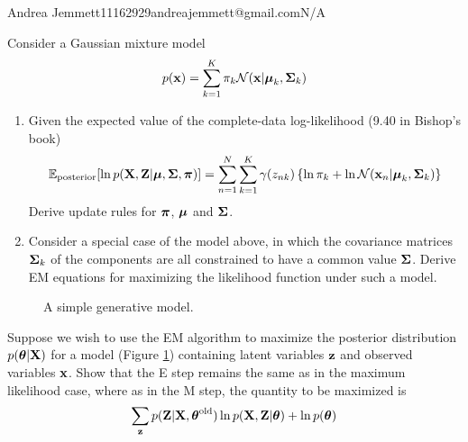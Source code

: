 \documentclass{amsmlaj}
\begin{document}
{Andrea Jemmett}{11162929}{andreajemmett@gmail.com}{N/A}


\begin{problem}
Consider a Gaussian mixture model
$$
p(\bm{\mathbf{x}}) = \sum_{k=1}^K  \pi_k \mathcal{N}(\bm{\mathbf{x}}|\bm{\mathbf{\mu}}_k,\bm{\mathbf{\Sigma}}_k)
$$
\begin{enumerate}
\item Given the expected value of the complete-data log-likelihood (9.40 in Bishop's book)
$$
\mathbb{E}_{\text{posterior}}[\ln p(\bm{\mathbf{X}},\bm{\mathbf{Z}}|\bm{\mathbf{\mu}}, \bm{\mathbf{\Sigma}},\bm{\mathbf{\pi}})] = \sum_{n=1}^N\sum_{k=1}^K \gamma(z_{nk}) \left\{ \ln\pi_k + \ln\mathcal{N}(\bm{\mathbf{x}}_n|\bm{\mathbf{\mu}}_k,\bm{\mathbf{\Sigma}}_k)\right\} \label{eq:ex_post}
$$
Derive update rules for $\bm{\mathbf{\pi}}$, $\bm{\mathbf{\mu}}$ and $\bm{\mathbf{\Sigma}}$. 

\item Consider a special case of the model above, in which the covariance matrices $\bm{\mathbf{\Sigma}}_k$ of the components are all constrained to have a common value $\bm{\mathbf{\Sigma}}$. Derive EM equations for maximizing the likelihood function under such a model.
\end{enumerate}

\end{problem}

\begin{problem}
\begin{figure}[htbp]
\centering
{}
\caption{A simple generative model.}
\label{fig:gm}
\end{figure}
Suppose we wish to use the EM algorithm to maximize the posterior distribution $p(\bm{\mathbf{\theta}}|\bm{\mathbf{X}})$ for a model (Figure \ref{fig:gm}) containing latent variables $\bm{\mathbf{z}}$ and observed variables $\bm{\mathbf{x}}$. Show that the E step remains the same as in the maximum likelihood case, where as in the M step, the quantity to be maximized is
$$
\sum_{\bm{\mathbf{z}}} p(\bm{\mathbf{Z}}|\bm{\mathbf{X}},\bm{\mathbf{\theta}}^{\text{old}})\ln p(\bm{\mathbf{X}},\bm{\mathbf{Z}}|\bm{\mathbf{\theta}}) + \ln p(\bm{\mathbf{\theta}})
$$
\end{problem}
\end{document}
